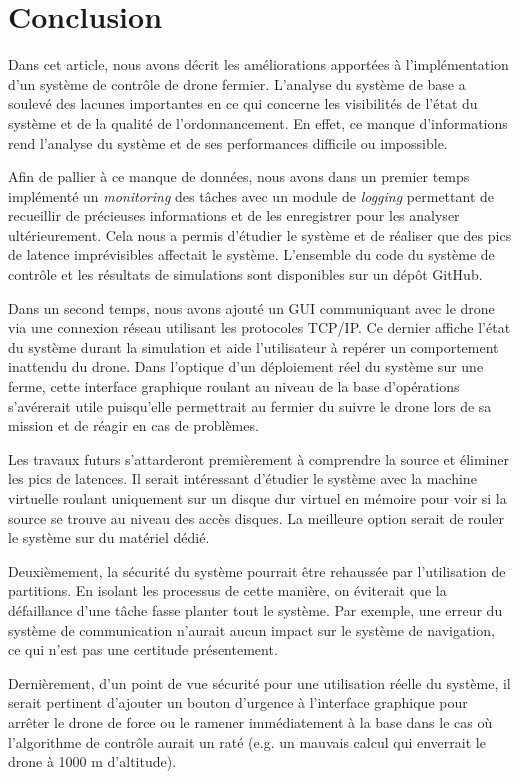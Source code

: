 \documentclass[journal]{IEEEtran}
\begin{document}
\section{Conclusion}
Dans cet article, nous avons décrit les améliorations apportées à l'implémentation d'un système de contrôle de drone fermier. L'analyse du système de base a soulevé des lacunes importantes en ce qui concerne les visibilités de l'état du système et de la qualité de l'ordonnancement. En effet, ce manque d'informations rend l'analyse du système et de ses performances difficile ou impossible. 

Afin de pallier à ce manque de données, nous avons dans un premier temps implémenté un \textit{monitoring} des tâches avec un module de \textit{logging} permettant de recueillir de précieuses informations et de les enregistrer pour les analyser ultérieurement. Cela nous a permis d'étudier le système et de réaliser que des pics de latence imprévisibles affectait le système.
L'ensemble du code du système de contrôle et les résultats de simulations sont disponibles sur un dépôt GitHub\cite{ref:code}.

Dans un second temps, nous avons ajouté un GUI communiquant avec le drone via une connexion réseau utilisant les protocoles TCP/IP. Ce dernier affiche l'état du système durant la simulation et aide l'utilisateur à repérer un comportement inattendu du drone. Dans l'optique d'un déploiement réel du système sur une ferme, cette interface graphique roulant au niveau de la base d'opérations s'avérerait utile puisqu'elle permettrait au fermier du suivre le drone lors de sa mission et de réagir en cas de problèmes.

Les travaux futurs s'attarderont premièrement à comprendre la source et éliminer les pics de latences. Il serait intéressant d'étudier le système avec la machine virtuelle roulant uniquement sur un disque dur virtuel en mémoire pour voir si la source se trouve au niveau des accès disques. La meilleure option serait de rouler le système sur du matériel dédié.

Deuxièmement, la sécurité du système pourrait être rehaussée par l'utilisation de partitions. En isolant les processus de cette manière, on éviterait que la défaillance d'une tâche fasse planter tout le système. Par exemple, une erreur du système de communication n'aurait aucun impact sur le système de navigation, ce qui n'est pas une certitude présentement.

Dernièrement, d'un point de vue sécurité pour une utilisation réelle du système, il serait pertinent d'ajouter un bouton d'urgence à l'interface graphique pour arrêter le drone de force ou le ramener immédiatement à la base dans le cas où l'algorithme de contrôle aurait un raté (e.g. un mauvais calcul qui enverrait le drone à 1000 m d'altitude). 
\end{document}
